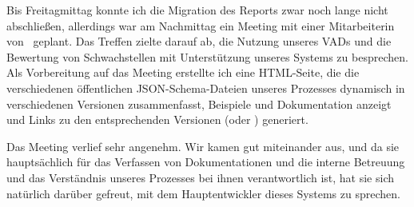 \sweekdaymarginpar{\weekdayFridayLong}

Bis Freitagmittag konnte ich die Migration des Reports zwar noch lange nicht abschließen, allerdings war am Nachmittag ein Meeting mit einer Mitarbeiterin von \aeclientZEZESE\ geplant.
Das Treffen zielte darauf ab, die Nutzung unseres VADs und die Bewertung von Schwachstellen mit Unterstützung unseres Systems zu besprechen.
Als Vorbereitung auf das Meeting erstellte ich eine HTML-Seite, die die verschiedenen öffentlichen JSON-Schema-Dateien unseres Prozesses dynamisch in verschiedenen Versionen zusammenfasst, Beispiele und Dokumentation anzeigt und Links zu den entsprechenden Versionen (oder ) generiert.

Das Meeting verlief sehr angenehm.
Wir kamen gut miteinander aus, und da sie hauptsächlich für das Verfassen von Dokumentationen und die interne Betreuung und das Verständnis unseres Prozesses bei ihnen verantwortlich ist, hat sie sich natürlich darüber gefreut, mit dem Hauptentwickler dieses Systems zu sprechen.

